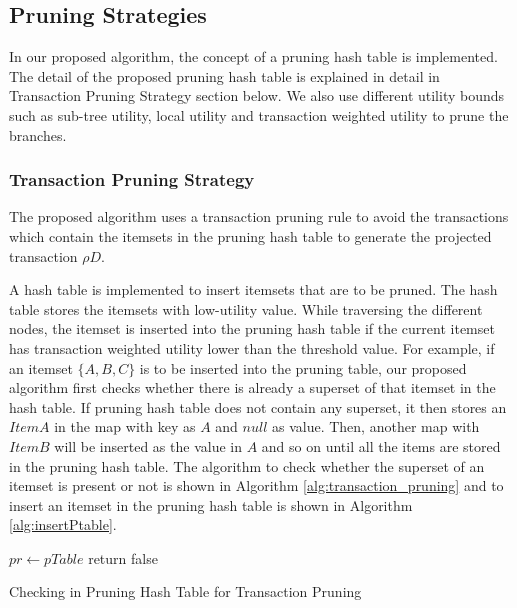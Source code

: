 \documentclass[11pt,openright]{report}
\begin{document}
\subsection{Pruning Strategies}
In our proposed algorithm, the concept of a pruning hash table is implemented. The detail of the proposed pruning hash table is explained in detail in Transaction Pruning Strategy section below. We also use different utility bounds such as sub-tree utility, local utility and transaction weighted utility to prune the branches.


\subsubsection{Transaction Pruning Strategy}
The proposed algorithm uses a transaction pruning rule to avoid the transactions which contain the itemsets in the pruning hash table to generate the projected transaction ${\rho}D$.

A hash table is implemented to insert itemsets that are to be pruned. The hash table stores the itemsets with low-utility value. While traversing the different nodes, the itemset is inserted into the pruning hash table if the current itemset has transaction weighted utility lower than the threshold value. For example, if an itemset $\{A,B,C\}$ is to be inserted into the pruning table, our proposed algorithm first checks whether there is already a superset of that itemset in the hash table. If pruning hash table does not contain any superset, it then stores an $Item A$ in the map with key as $A$ and $null$ as value. Then, another map with $Item B$ will be inserted as the value in $A$ and so on until all the items are stored in the pruning hash table.
The algorithm to check whether the superset of an itemset is present or not is shown in Algorithm \ref{alg:transaction_pruning} and to insert an itemset in the pruning hash table is shown in Algorithm \ref{alg:insertPtable}.

{\SetAlgoNoLine
	\begin{algorithm}
		 {
			$pr \gets pTable$\;
			 {
			}
			return false\;
		}
		\caption{Checking in Pruning Hash Table for Transaction Pruning}
		\label{alg:transaction_pruning}
	\end{algorithm}
}
\end{document}
